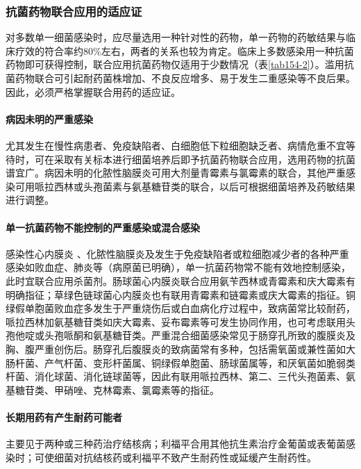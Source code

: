 \subsubsection{抗菌药物联合应用的适应证}

对多数单一细菌感染时，应尽量选用一种针对性的药物，单一药物的药敏结果与临床疗效的符合率约80\%左右，两者的关系也较为肯定。临床上多数感染用一种抗菌药物即可获得控制，联合应用抗菌药物仅适用于少数情况（表\ref{tab154-2}）。滥用抗菌药物联合可引起耐药菌株增加、不良反应增多、易于发生二重感染等不良后果。因此，必须严格掌握联合用药的适应证。

\paragraph{病因未明的严重感染}

尤其发生在慢性病患者、免疫缺陷者、白细胞低下粒细胞缺乏者、病情危重不宜等待时，可在采取有关标本进行细菌培养后即予抗菌药物联合应用，选用药物的抗菌谱宜广。病因未明的化脓性脑膜炎可用大剂量青霉素与氯霉素的联合，其他严重感染可用哌拉西林或头孢菌素与氨基糖苷类的联合，以后可根据细菌培养及药敏结果进行调整。

\paragraph{单一抗菌药物不能控制的严重感染或混合感染}

感染性心内膜炎
、化脓性脑膜炎及发生于免疫缺陷者或粒细胞减少者的各种严重感染如败血症、肺炎等（病原菌已明确），单一抗菌药物常不能有效地控制感染，此时宜联合应用杀菌剂。肠球菌心内膜炎联合应用氨苄西林或青霉素和庆大霉素有明确指征；草绿色链球菌心内膜炎也有联用青霉素和链霉素或庆大霉素的指征。铜绿假单胞菌败血症多发生于严重烧伤后或白血病化疗过程中，致病菌常比较耐药，哌拉西林加氨基糖苷类如庆大霉素、妥布霉素等可发生协同作用，也可考虑联用头孢他啶或头孢哌酮和氨基糖苷类。严重混合细菌感染常见于肠穿孔所致的腹膜炎及胸、腹严重创伤后。肠穿孔后腹膜炎的致病菌常有多种，包括需氧菌或兼性菌如大肠杆菌、产气杆菌、变形杆菌属、铜绿假单胞菌、肠球菌属等，和厌氧菌如脆弱类杆菌、消化球菌、消化链球菌等，因此有联用哌拉西林、第二、三代头孢菌素、氨基糖苷类、甲硝唑、克林霉素、氯霉素等的指征。

\paragraph{长期用药有产生耐药可能者}

主要见于两种或三种药治疗结核病；利福平合用其他抗生素治疗金葡菌或表葡菌感染时；可使细菌对抗结核药或利福平不致产生耐药性或延缓产生耐药性。

